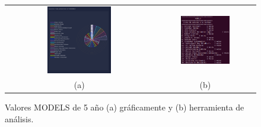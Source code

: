 \documentclass[a4paper, 12pt]{book}
\begin{document}
\begin{figure}[!h]
    \centering
    \begin{tabular}{cc}
    \includegraphics[width=0.45\textwidth]{img/models_5_years_graph.png} &  
    \includegraphics[width=0.52\textwidth]{img/models_5_years.png} \\ 
    (a) &(b) 
    \end{tabular}
    \caption{Valores MODELS de 5 año (a) gráficamente y (b) herramienta de análisis.}
    \label{fig:comp_models_5_year}
\end{figure}
\end{document}
